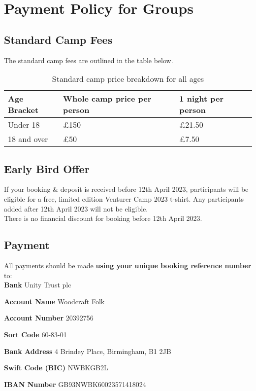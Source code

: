 \chapter{Payment Policy for Groups}

\section{Standard Camp Fees}
The standard camp fees are outlined in the table below.
\begin{table}[H]
    \centering   
    \begin{tabularx}{0.9\textwidth}{XXX}
        \textbf{Age Bracket} & \textbf{Whole camp price per person} & \textbf{1 night per person} \\
        \hline
        \hline
        Under 18 & £150 & £21.50\\
        \hline
        18 and over & £50 & £7.50\\
        \hline
    \end{tabularx}
    \caption{Standard camp price breakdown for all ages}
\end{table}

\section{Early Bird Offer}
If your booking \& deposit is received before 12th April 2023, participants will be eligible for a free, limited edition Venturer Camp 2023 t-shirt. Any participants added after 12th April 2023 will not be eligible.\\[1em]
There is no financial discount for booking before 12th April 2023.

\section{Payment}
All payments should be made \textbf{using your unique booking reference number} to:\\
\textbf{Bank} Unity Trust plc

\textbf{Account Name} Woodcraft Folk  

\textbf{Account Number} 20392756   

\textbf{Sort Code}  60-83-01  

\textbf{Bank Address} 4 Brindey Place, Birmingham, B1 2JB  

\textbf{Swift Code (BIC)} NWBKGB2L  

\textbf{IBAN Number} GB93NWBK60023571418024  

